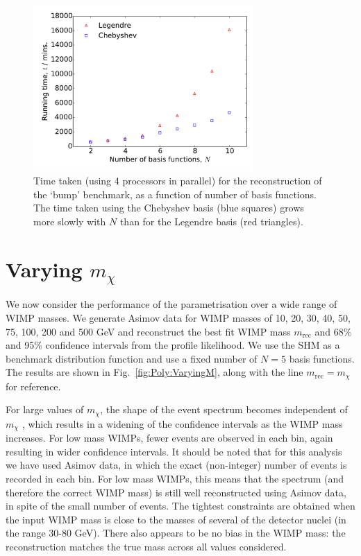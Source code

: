 \begin{figure}[t]
\centering
  \includegraphics[width=0.75\textwidth]{Poly/RunTimes.pdf}
  \caption{Time taken (using 4 processors in parallel) for the reconstruction of the `bump' benchmark, as a function of number of basis functions. The time taken using the Chebyshev basis (blue squares) grows more slowly with $N$ than for the Legendre basis (red triangles).}
  \label{fig:Poly:times}
\end{figure}

\section{Varying $m_\chi$}
\label{sec:Poly:mass}

We now consider the performance of the parametrisation over a wide range of WIMP masses. We generate Asimov data for WIMP masses of 10, 20, 30, 40, 50, 75, 100, 200 and 500 GeV and reconstruct the best fit WIMP mass $m_\textrm{rec}$ and 68\% and 95\% confidence intervals from the profile likelihood. We use the SHM as a benchmark distribution function and use a fixed number of $N=5$ basis functions. The results are shown in Fig.~\ref{fig:Poly:VaryingM}, along with the line $m_\textrm{rec} = m_\chi$ for reference.

For large values of $m_\chi$, the shape of the event spectrum becomes independent of $m_\chi$ \cite{Green:2008}, which results in a widening of the confidence intervals as the WIMP mass increases. For low mass WIMPs, fewer events are observed in each bin, again resulting in wider confidence intervals. It should be noted that for this analysis we have used Asimov data, in which the exact (non-integer) number of events is recorded in each bin. For low mass WIMPs, this means that the spectrum (and therefore the correct WIMP mass) is still well reconstructed using Asimov data, in spite of the small number of events. The tightest constraints are obtained when the input WIMP mass is close to the masses of several of the detector nuclei (in the range 30-80 GeV). There also appears to be no bias in the WIMP mass: the reconstruction matches the true mass across all values considered.

